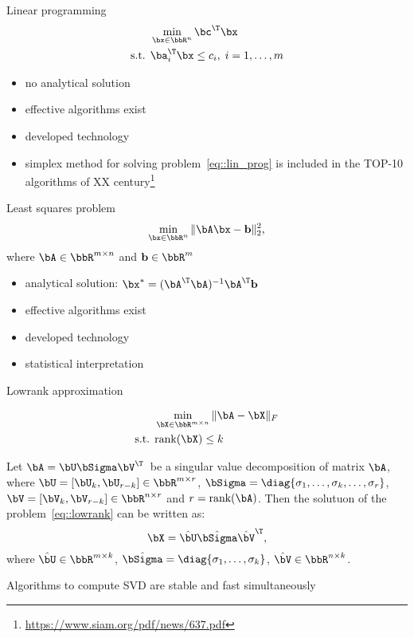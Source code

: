 \documentclass[12pt]{beamer}
\begin{document}
\begin{frame}{Linear programming}
\begin{equation}
\begin{split}
&\min\limits_{\bx \in \bbR^n} \bc^{\T}\bx\\
\text{s.t. } & \ba^{\T}_i \bx \leq c_i, \; i = 1,\ldots, m
\end{split}
\label{eq::lin_prog}
\end{equation}
\begin{itemize}
\item no analytical solution
\item effective algorithms exist
\item developed technology
\item simplex method for solving problem~\eqref{eq::lin_prog} is  included in the TOP-10 algorithms of XX century\footnote{\url{https://www.siam.org/pdf/news/637.pdf}}
\end{itemize}
\end{frame}

\begin{frame}{Least squares problem}
\begin{equation}
\min\limits_{\bx \in \bbR^n} \|\bA\bx - \mathbf{b} \|^2_2,
\label{eq::least_sq}
\end{equation}
where $\bA \in \bbR^{m \times n}$ and $\mathbf{b} \in \bbR^m$
\begin{itemize}
\item analytical solution: $\bx^* = (\bA^{\T}\bA)^{-1}\bA^{\T}\mathbf{b}$
\item effective algorithms exist
\item developed technology
\item statistical interpretation
\end{itemize}
\end{frame}

\begin{frame}{Lowrank approximation}

\begin{equation}
\begin{split}
&\min\limits_{\bX \in \bbR^{m \times n}} \|\bA - \bX \|_F \\
\text{s.t. } & \text{rank}(\bX) \leq k
\end{split}
\label{eq::lowrank}
\end{equation}

\begin{Theorem}
Let $\bA = \bU\bSigma\bV^{\T}$~be a singular value decomposition of matrix $\bA$, where $\bU = [\bU_k, \bU_{r-k}] \in \bbR^{m \times r}$, $\bSigma = \diag{\sigma_1, \ldots, \sigma_k, \ldots, \sigma_r}$, $\bV = [\bV_k, \bV_{r - k}] \in \bbR^{n \times r}$ and $r = \text{rank}(\bA)$.  
Then the solutuon of the problem~\eqref{eq::lowrank} can be written as:
\[
\bX = \hat{\bU} \hat{\bSigma} \hat{\bV}^{\T},
\]
where $\hat{\bU} \in \bbR^{m \times k}$, $\hat{\bSigma} = \diag{\sigma_1, \ldots, \sigma_k}$, $\hat{\bV} \in \bbR^{n \times k}$.
\end{Theorem}
\small Algorithms to compute SVD are stable and fast simultaneously
\end{frame}
\end{document}
